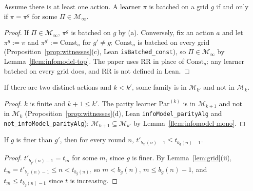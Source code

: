 \documentclass[11pt]{article}
\newcommand{\Mk}[1]{\mathcal M_{#1}}
\begin{document}
\begin{lemma}[components of $\Mk{\infty}$]\label{flem:components}
Assume there is at least one action. A learner $\pi$ is batched on a grid $g$ if and only if
$\pi=\pi^g$ for some $\Pi\in\Mk{\infty}$.
\end{lemma}

\begin{proof}
If $\Pi\in\Mk{\infty}$, $\pi^g$ is batched on $g$ by (a). Conversely, fix an action $a$ and let
$\pi^g:=\pi$ and $\pi^{g'}:=\mathrm{Const}_a$ for $g'\ne g$; $\mathrm{Const}_a$ is batched on every
grid (Proposition~\ref{prop:witnesses}(c), Lean \texttt{isBatched\_const}), so
$\Pi\in\Mk{\infty}$ by Lemma~\ref{flem:infomodel-top}. The paper uses $\mathrm{RR}$ in place of
$\mathrm{Const}_a$; any learner batched on every grid does, and $\mathrm{RR}$ is not defined in
Lean.
\end{proof}

\begin{lemma}[strictness]\label{flem:strict}
If there are two distinct actions and $k<k'$, some family is in $\Mk{k'}$ and not in $\Mk{k}$.
\end{lemma}

\begin{proof}
$k$ is finite and $k+1\le k'$. The parity learner $\mathrm{Par}^{(k)}$ is in $\Mk{k+1}$ and not
in $\Mk{k}$ (Proposition~\ref{prop:witnesses}(d), Lean \texttt{infoModel\_parityAlg} and
\texttt{not\_infoModel\_parityAlg}); $\Mk{k+1}\subseteq\Mk{k'}$ by
Lemma~\ref{flem:infomodel-mono}.
\end{proof}

\begin{lemma}\label{flem:last-end-finer}
If $g$ is finer than $g'$, then for every round $n$,
$t'_{b_{g'}(n)-1}\le t_{b_g(n)-1}$.
\end{lemma}

\begin{proof}
$t'_{b_{g'}(n)-1}=t_m$ for some $m$, since $g$ is finer. By Lemma~\ref{lem:grid}(ii),
$t_m=t'_{b_{g'}(n)-1}\le n<t_{b_g(n)}$, so $m<b_g(n)$, $m\le b_g(n)-1$, and
$t_m\le t_{b_g(n)-1}$ since $t$ is increasing.
\end{proof}
\end{document}
